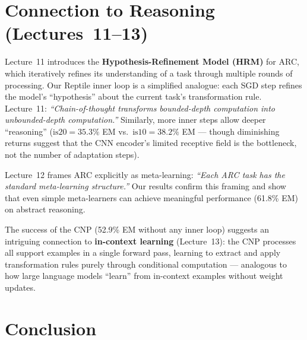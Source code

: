 \documentclass[11pt,a4paper]{article}
\begin{document}
\section{Connection to Reasoning (Lectures~11--13)}

Lecture~11 introduces the \textbf{Hypothesis-Refinement Model (HRM)} for ARC, which iteratively refines its understanding of a task through multiple rounds of processing. Our Reptile inner loop is a simplified analogue: each SGD step refines the model's ``hypothesis'' about the current task's transformation rule. Lecture~11: \emph{``Chain-of-thought transforms bounded-depth computation into unbounded-depth computation.''} Similarly, more inner steps allow deeper ``reasoning'' ($\text{is20} = 35.3\%$ EM vs.\ $\text{is10} = 38.2\%$ EM --- though diminishing returns suggest that the CNN encoder's limited receptive field is the bottleneck, not the number of adaptation steps).

Lecture~12 frames ARC explicitly as meta-learning: \emph{``Each ARC task has the standard meta-learning structure.''} Our results confirm this framing and show that even simple meta-learners can achieve meaningful performance (61.8\% EM) on abstract reasoning.

The success of the CNP (52.9\% EM without any inner loop) suggests an intriguing connection to \textbf{in-context learning} (Lecture~13): the CNP processes all support examples in a single forward pass, learning to extract and apply transformation rules purely through conditional computation --- analogous to how large language models ``learn'' from in-context examples without weight updates.

\section{Conclusion}
\end{document}

